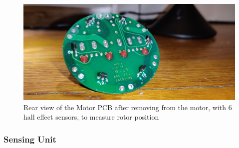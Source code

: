 \documentclass[]{formalLabReport}
\begin{document}
\begin{figure}
    \includegraphics[]{segwayMotorPCBRear.jpg}
    \caption{Rear view of the Motor PCB after removing from the motor, with 6 hall effect sensors, to measure rotor position}
    \label{fig:segwayMotorPCBRear.jpg}
\end{figure}

\subsubsection{Sensing Unit}
\end{document}
